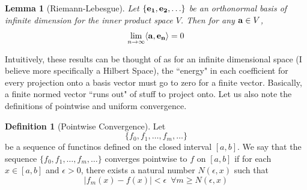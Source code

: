 \documentclass{report}
\newtheorem{lemma}[theorem]{Lemma}
\theoremstyle{definition}
\newtheorem{definition}[theorem]{Definition}
\theoremstyle{remark}
\begin{document}
\begin{lemma}[Riemann-Lebesgue]
    Let $\{\bold{e_1,e_2,}\ldots\}$ be an orthonormal basis of infinite dimension for the inner product space $V$. Then for any $\bold{a}\in V$, \label{lemma:rl}
    \begin{equation*}
        \lim_{n\rightarrow \infty}\langle\bold{a,e_n}\rangle = 0
    \end{equation*}
\end{lemma}
Intuitively, these results can be thought of as for an infinite dimensional space (I believe more specifically a Hilbert Space), the ``energy" in each coefficient for every projection onto a basis vector must go to zero for a finite vector. Basically, a finite normed vector ``runs out" of stuff to project onto. Let us also note the definitions of pointwise and uniform convergence.
\begin{definition}[Pointwise Convergence]
    Let \begin{equation*}
        \{f_0,f_1,\ldots,f_m,\ldots\}
    \end{equation*}
    be a sequence of functinos defined on the closed interval $[a,b]$. We say that the sequence $\{f_0,f_1,\ldots,f_m,\ldots\}$ converges pointwise to $f$ on $[a,b]$ if for each $x\in [a,b]$ and $\epsilon>0$, there exists a natural number $N(\epsilon,x)$ such that \begin{equation*}
        |f_m(x)-f(x)|<\epsilon \,\,\, \forall m \geq N(\epsilon,x)
    \end{equation*}
\end{definition}
\end{document}
